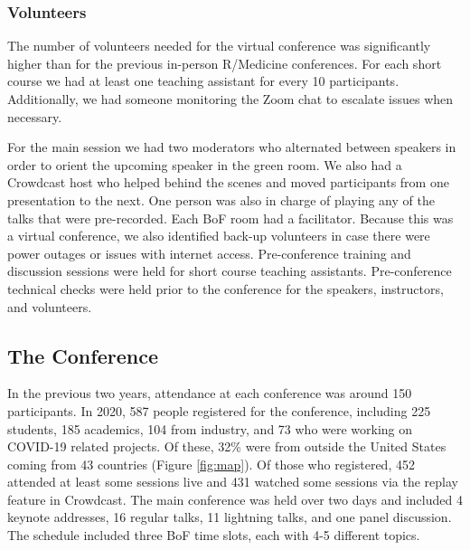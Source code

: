 \hypertarget{volunteers}{%
\subsubsection{Volunteers}\label{volunteers}}

The number of volunteers needed for the virtual conference was
significantly higher than for the previous in-person R/Medicine
conferences. For each short course we had at least one teaching
assistant for every 10 participants. Additionally, we had someone
monitoring the Zoom chat to escalate issues when necessary.

For the main session we had two moderators who alternated between
speakers in order to orient the upcoming speaker in the green room. We
also had a Crowdcast host who helped behind the scenes and moved
participants from one presentation to the next. One person was also in
charge of playing any of the talks that were pre-recorded. Each BoF room
had a facilitator. Because this was a virtual conference, we also
identified back-up volunteers in case there were power outages or issues
with internet access. Pre-conference training and discussion sessions
were held for short course teaching assistants. Pre-conference technical
checks were held prior to the conference for the speakers, instructors,
and volunteers.

\hypertarget{the-conference}{%
\subsection{The Conference}\label{the-conference}}

In the previous two years, attendance at each conference was around 150
participants. In 2020, 587 people registered for the conference,
including 225 students, 185 academics, 104 from industry, and 73 who
were working on COVID-19 related projects. Of these, 32\% were from
outside the United States coming from 43 countries (Figure
\ref{fig:map}). Of those who registered, 452 attended at least some
sessions live and 431 watched some sessions via the replay feature in
Crowdcast. The main conference was held over two days and included 4
keynote addresses, 16 regular talks, 11 lightning talks, and one panel
discussion. The schedule included three BoF time slots, each with 4-5
different topics.

